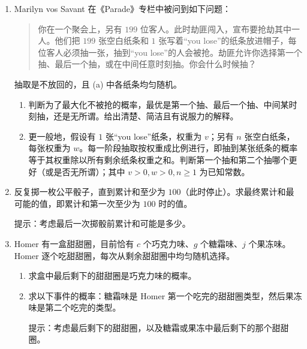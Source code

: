 \documentclass[UTF8,12pt,a4paper,fontset=fandol]{ctexart}
\begin{document}
\begin{enumerate}
  \item Marilyn vos Savant 在《Parade》专栏中被问到如下问题：
  \begin{quote}
  你在一个聚会上，另有 $199$ 位客人。此时劫匪闯入，宣布要抢劫其中一人。他们把 $199$ 张空白纸条和 $1$ 张写着“you lose”的纸条放进帽子，每位客人必须抽一张，抽到“you lose”的人会被抢。劫匪允许你选择第一个抽、最后一个抽，或在中间任意时刻抽。你会什么时候抽？
  \end{quote}
  抽取是不放回的，且 (a) 中各纸条均匀随机。
  \begin{enumerate}
    \item 判断为了最大化不被抢的概率，最优是第一个抽、最后一个抽、中间某时刻抽，还是无所谓。给出清楚、简洁且有说服力的解释。
    \item 更一般地，假设有 $1$ 张“you lose”纸条，权重为 $v$；另有 $n$ 张空白纸条，每张权重为 $w$。每一阶段抽取按权重成比例进行，即抽到某张纸条的概率等于其权重除以所有剩余纸条权重之和。判断第一个抽和第二个抽哪个更好（或是否无所谓）；其中 $v>0,w>0,n\ge 1$ 为已知常数。
  \end{enumerate}

  \item 反复掷一枚公平骰子，直到累计和至少为 $100$（此时停止）。求最终累计和最可能的值，即累计和第一次至少为 $100$ 时的值。

  提示：考虑最后一次掷骰前累计和可能是多少。

  \item Homer 有一盒甜甜圈，目前恰有 $c$ 个巧克力味、$g$ 个糖霜味、$j$ 个果冻味。Homer 逐个吃甜甜圈，每次从剩余甜甜圈中均匀随机选择。
  \begin{enumerate}
    \item 求盒中最后剩下的甜甜圈是巧克力味的概率。
    \item 求以下事件的概率：糖霜味是 Homer 第一个吃完的甜甜圈类型，然后果冻味是第二个吃完的类型。

    提示：考虑最后剩下的甜甜圈，以及糖霜或果冻中最后剩下的那个甜甜圈。
  \end{enumerate}


\end{enumerate}
\end{document}
